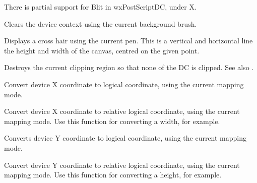 There is partial support for Blit in wxPostScriptDC, under X.



Clears the device context using the current background brush.

\label{wxdccrosshair}


Displays a cross hair using the current pen. This is a vertical
and horizontal line the height and width of the canvas, centred
on the given point.

\label{wxdcdestroyclippingregion}


Destroys the current clipping region so that none of the DC is clipped.
See also .

\label{wxdcdevicetologicalx}


Convert device X coordinate to logical coordinate, using the current
mapping mode.

\label{wxdcdevicetologicalxrel}


Convert device X coordinate to relative logical coordinate, using the current
mapping mode. Use this function for converting a width, for example.

\label{wxdcdevicetologicaly}


Converts device Y coordinate to logical coordinate, using the current
mapping mode.

\label{wxdcdevicetologicalyrel}


Convert device Y coordinate to relative logical coordinate, using the current
mapping mode. Use this function for converting a height, for example.


